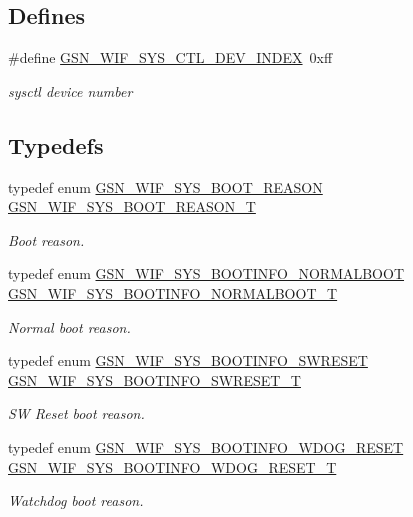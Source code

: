 \subsection*{Defines}
\begin{DoxyCompactItemize}
\item 
\#define \hyperlink{a00639_ga89d2e01544259ce81d97d4161d5f3c51}{GSN\_\-WIF\_\-SYS\_\-CTL\_\-DEV\_\-INDEX}~0xff
\begin{DoxyCompactList}\small\item\em sysctl device number \end{DoxyCompactList}\end{DoxyCompactItemize}
\subsection*{Typedefs}
\begin{DoxyCompactItemize}
\item 
typedef enum \hyperlink{a00639_ga36af0a76d3b3d7cad5c5dd1f60c39091}{GSN\_\-WIF\_\-SYS\_\-BOOT\_\-REASON} \hyperlink{a00639_ga213ad232655e90fd6ca561d772ef7b96}{GSN\_\-WIF\_\-SYS\_\-BOOT\_\-REASON\_\-T}
\begin{DoxyCompactList}\small\item\em Boot reason. \end{DoxyCompactList}\item 
typedef enum \hyperlink{a00639_gaf19dc62e1c923b6383337e8e8296c242}{GSN\_\-WIF\_\-SYS\_\-BOOTINFO\_\-NORMALBOOT} \hyperlink{a00639_ga0c8b91590ceaee6ceb3d5267d191318d}{GSN\_\-WIF\_\-SYS\_\-BOOTINFO\_\-NORMALBOOT\_\-T}
\begin{DoxyCompactList}\small\item\em Normal boot reason. \end{DoxyCompactList}\item 
typedef enum \hyperlink{a00639_ga9d8caf6999c8508aaf8d3b414693a0a2}{GSN\_\-WIF\_\-SYS\_\-BOOTINFO\_\-SWRESET} \hyperlink{a00639_ga932935c40cc08491352069856307cf6e}{GSN\_\-WIF\_\-SYS\_\-BOOTINFO\_\-SWRESET\_\-T}
\begin{DoxyCompactList}\small\item\em SW Reset boot reason. \end{DoxyCompactList}\item 
typedef enum \hyperlink{a00639_ga93cc8ed01d7724e043b553774ec3df16}{GSN\_\-WIF\_\-SYS\_\-BOOTINFO\_\-WDOG\_\-RESET} \hyperlink{a00639_ga1e2be305dad8c272f3e260243e3af8fe}{GSN\_\-WIF\_\-SYS\_\-BOOTINFO\_\-WDOG\_\-RESET\_\-T}
\begin{DoxyCompactList}\small\item\em Watchdog boot reason. \end{DoxyCompactList}\item 

\end{DoxyCompactItemize}
